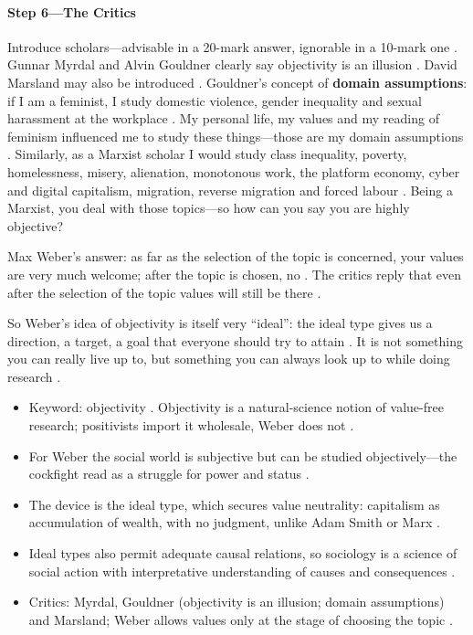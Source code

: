 \paragraph{Step 6---The Critics}
\begin{CriticalPoint}
Introduce scholars---advisable in a 20-mark answer, ignorable in a 10-mark one .
Gunnar Myrdal and Alvin Gouldner clearly say objectivity is an illusion . David Marsland may also be introduced .
Gouldner's concept of \textbf{domain assumptions}: if I am a feminist, I study domestic violence, gender inequality and sexual harassment at the workplace . My personal life, my values and my reading of feminism influenced me to study these things---those are my domain assumptions .
Similarly, as a Marxist scholar I would study class inequality, poverty, homelessness, misery, alienation, monotonous work, the platform economy, cyber and digital capitalism, migration, reverse migration and forced labour . Being a Marxist, you deal with those topics---so how can you say you are highly objective? 

Max Weber's answer: as far as the selection of the topic is concerned, your values are very much welcome; after the topic is chosen, no . The critics reply that even after the selection of the topic values will still be there .
\end{CriticalPoint}

\begin{KeyConcept}
So Weber's idea of objectivity is itself very ``ideal'': the ideal type gives us a direction, a target, a goal that everyone should try to attain . It is not something you can really live up to, but something you can always look up to while doing research .
\end{KeyConcept}

\begin{QuickRevision}
\begin{itemize}
    \item Keyword: objectivity . Objectivity is a natural-science notion of value-free research; positivists import it wholesale, Weber does not .
    \item For Weber the social world is subjective but can be studied objectively---the cockfight read as a struggle for power and status .
    \item The device is the ideal type, which secures value neutrality: capitalism as accumulation of wealth, with no judgment, unlike Adam Smith or Marx .
    \item Ideal types also permit adequate causal relations, so sociology is a science of social action with interpretative understanding of causes and consequences .
    \item Critics: Myrdal, Gouldner (objectivity is an illusion; domain assumptions) and Marsland; Weber allows values only at the stage of choosing the topic .
\end{itemize}
\end{QuickRevision}

